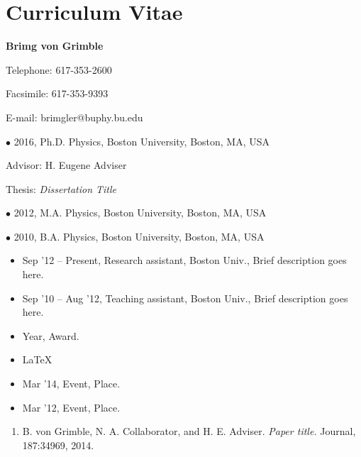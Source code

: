 \chapter*{Curriculum Vitae}

{{\noindent\LARGE \bf Brimg von Grimble}}

\bigskip
\bigskip

{
\vskip 0cm    \hfill {Telephone: 617-353-2600}

\vskip 0cm    \hfill {Facsimile: 617-353-9393}

\vskip 0cm    \hfill {E-mail: brimgler@buphy.bu.edu}
}

\bigskip
\bigskip


$\bullet$ 2016, Ph.D. Physics, Boston University, Boston, MA, USA
\smallskip

\hspace{0.45cm} Advisor: H. Eugene Adviser
\smallskip

\hspace{0.45cm} Thesis: {\em Dissertation Title}

$\bullet$ 2012, M.A. Physics, Boston University, Boston, MA, USA

$\bullet$ 2010, B.A. Physics, Boston University, Boston, MA, USA
\bigskip

\begin{itemize}
\item Sep '12 -- Present, Research assistant, Boston Univ., Brief description goes here.
\item Sep '10 -- Aug '12, Teaching assistant, Boston Univ., Brief description goes here.
\end{itemize}
\bigskip

\begin{itemize}
\item Year, Award.
\end{itemize}
\bigskip

\begin{itemize}
\item \LaTeX
\end{itemize}
\newpage %

\begin{itemize}
\item Mar '14,       Event, Place.
\end{itemize}
\bigskip


\begin{itemize}
\item Mar '12,        Event, Place.
\end{itemize}
\bigskip


\begin{enumerate}

\item B. von Grimble, N. A. Collaborator, and H. E. Adviser. \emph{Paper title.} Journal, 187:34969, 2014.

\end{enumerate}


